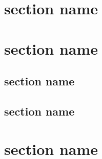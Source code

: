 \documentclass{beamer}
\begin{document}
\section{section name}
\begin{frame}
\end{frame}

\section{section name}

\begin{frame}
\tableofcontents[currentsection,subsectionstyle=shaded/shaded/shaded]
\end{frame}

\subsection{section name}
\begin{frame}
\end{frame}

\subsection{section name}
\begin{frame}
\end{frame}

\section{section name}
\begin{frame}
\end{frame}
\end{document}
